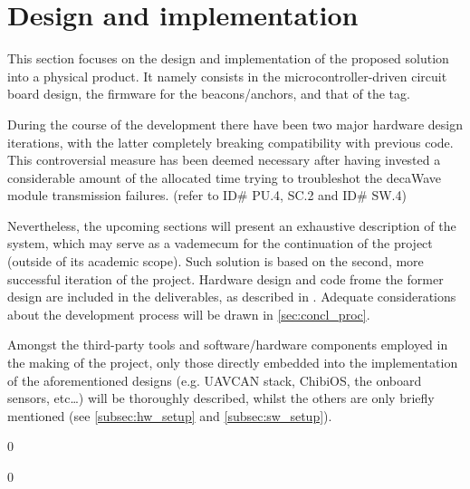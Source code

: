 \chapter{Design and implementation}\label{ch:design}

This section focuses on the design and implementation of the proposed solution into a physical product.
It namely consists in the microcontroller-driven circuit board design, the firmware for the beacons/anchors, and that of the tag.

During the course of the development there have been two major hardware design iterations, with the latter completely breaking compatibility with previous code.
This controversial measure has been deemed necessary after having invested a considerable amount of the allocated time trying to troubleshot the decaWave module transmission failures. (refer to  ID\# PU.4, SC.2 and  ID\# SW.4)

Nevertheless, the upcoming sections will present an exhaustive description of the system, which may serve as a vademecum for the continuation of the project (outside of its academic scope).
Such solution is based on the second, more successful iteration of the project.
Hardware design and code frome the former design are included in the deliverables, as described in .
Adequate considerations about the development process will be drawn in \autoref{sec:concl_proc}.

Amongst the third-party tools and software/hardware components employed in the making of the project, only those directly embedded into the implementation of the aforementioned designs (e.g. UAVCAN stack, ChibiOS, the onboard sensors, etc\dots) will be thoroughly described, whilst the others are only briefly mentioned (see \autoref{subsec:hw_setup} and \autoref{subsec:sw_setup}).

{0}

{0}

